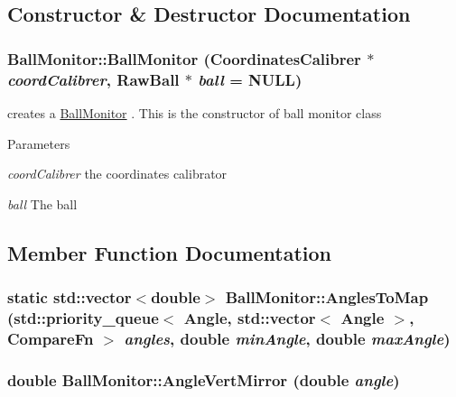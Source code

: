 \subsection{Constructor \& Destructor Documentation}
\hypertarget{classBallMonitor_a176a257973eefa572b6972aa6b5a605d}{
\subsubsection[{BallMonitor}]{\setlength{\rightskip}{0pt plus 5cm}BallMonitor::BallMonitor ({\bf CoordinatesCalibrer} $\ast$ {\em coordCalibrer}, \/  RawBall $\ast$ {\em ball} = {\ttfamily NULL})}}
\label{classBallMonitor_a176a257973eefa572b6972aa6b5a605d}


creates a \hyperlink{classBallMonitor}{BallMonitor} . This is the constructor of ball monitor class 


\begin{DoxyParams}{Parameters}
\item[{\em coordCalibrer}]the coordinates calibrator \item[{\em ball}]The ball \end{DoxyParams}


\subsection{Member Function Documentation}
\hypertarget{classBallMonitor_a8f3198b6b4ef8eb52c0ff04afd33cc8f}{
\subsubsection[{AnglesToMap}]{\setlength{\rightskip}{0pt plus 5cm}static std::vector$<$double$>$ BallMonitor::AnglesToMap (std::priority\_\-queue$<$ {\bf Angle}, std::vector$<$ {\bf Angle} $>$, {\bf CompareFn} $>$ {\em angles}, \/  double {\em minAngle}, \/  double {\em maxAngle})}}
\label{classBallMonitor_a8f3198b6b4ef8eb52c0ff04afd33cc8f}
\hypertarget{classBallMonitor_a32d7b6d877b84c7d7fd9bc9ffe659562}{
\subsubsection[{AngleVertMirror}]{\setlength{\rightskip}{0pt plus 5cm}double BallMonitor::AngleVertMirror (double {\em angle})}}
\label{classBallMonitor_a32d7b6d877b84c7d7fd9bc9ffe659562}


